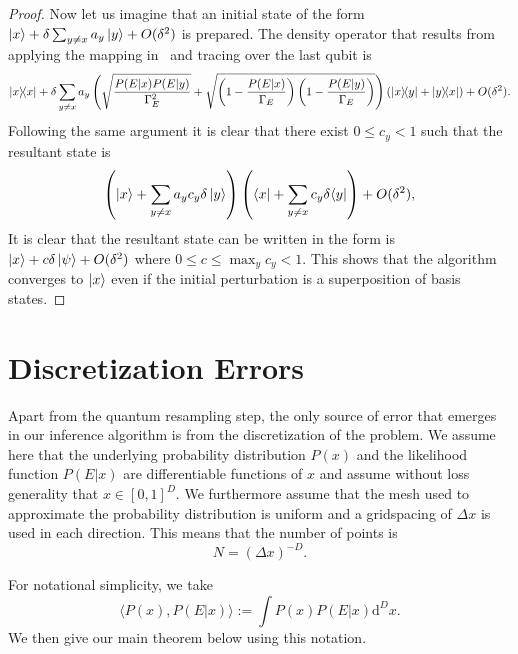 \documentclass[aps,amsmath,onecolumn,amssymb,notitlepage]{revtex4-1}
\begin{document}
\begin{proof}
Now let us imagine that an initial state of the form $\left|x\right\rangle + \delta \sum_{y\ne x} a_y \left|y\right\rangle + O(\delta^2)$ is prepared.  The density operator that results from applying the mapping in~ and tracing over the last qubit is
\begin{equation}
|x\rangle\!\langle x| + \delta\sum_{y\ne x}a_y\left(\sqrt{\frac{P(E|x)P(E|y)}{\Gamma_E^2}} + \sqrt{\left(1-\frac{P(E|x)}{\Gamma_E}\right)\left(1-\frac{P(E|y)}{\Gamma_E}\right)} \right)(|x\rangle\!\langle y|+|y\rangle\!\langle x|) + O(\delta^2).
\end{equation}
Following the same argument it is clear that there exist $0\le c_y<1$ such that the resultant state is
\begin{equation}
\left(\left|x\right\rangle + \sum_{y\ne x}a_y c_y\delta \left|y\right\rangle\right)\left(\langle x| + \sum_{y\ne x}c_y\delta \langle y|\right) + O(\delta^2),
\end{equation}
It is clear that the resultant state can be written in the form is $\left|x\right\rangle + c\delta \left|\psi\right\rangle + O(\delta^2)$ where $0\le c\le \max_y c_y < 1$.  This shows that the algorithm converges to $\left|x\right\rangle$ even if the initial perturbation is a superposition of basis states.
\end{proof}


\section{Discretization Errors}\label{app:discrete}
Apart from the quantum resampling step, the only source of error that emerges in our inference algorithm is from the discretization of the problem.  We assume here that the underlying probability distribution $P(x)$ and the likelihood function $P(E|x)$ are differentiable functions of $x$ and assume without loss generality that $x\in [0,1]^D$.  We furthermore assume that the mesh used to approximate the probability distribution is uniform and a gridspacing of $\Delta x$ is used in each direction.  This means that the number of points is 
\begin{equation}
N= (\Delta x)^{-D}.
\end{equation}

For notational simplicity,  we take
\begin{equation}
\langle P(x), P(E|x) \rangle := \int P(x) P(E|x) \mathrm{d}^D x.
\end{equation}
We then give our main theorem below using this notation.
\end{document}
